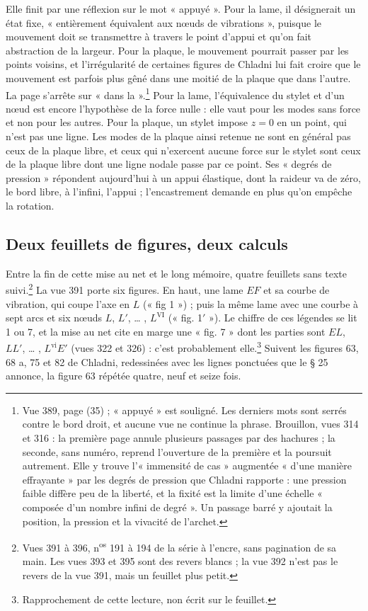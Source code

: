 \documentclass[11pt,a4paper]{article}
\begin{document}
Elle finit par une réflexion sur le mot « appuyé ». Pour la lame, il désignerait un état fixe, « entièrement équivalent aux nœuds de vibrations », puisque le mouvement doit se transmettre à travers le point d'appui et qu'on fait abstraction de la largeur. Pour la plaque, le mouvement pourrait passer par les points voisins, et l'irrégularité de certaines figures de Chladni lui fait croire que le mouvement est parfois plus gêné dans une moitié de la plaque que dans l'autre. La page s'arrête sur « dans la ».\footnote{Vue 389, page (35) ; « appuyé » est souligné. Les derniers mots sont serrés contre le bord droit, et aucune vue ne continue la phrase. Brouillon, vues 314 et 316 : la première page annule plusieurs passages par des hachures ; la seconde, sans numéro, reprend l'ouverture de la première et la poursuit autrement. Elle y trouve l'« immensité de cas » augmentée « d'une manière effrayante » par les degrés de pression que Chladni rapporte : une pression faible diffère peu de la liberté, et la fixité est la limite d'une échelle « composée d'un nombre infini de degré ». Un passage barré y ajoutait la position, la pression et la vivacité de l'archet.} Pour la lame, l'équivalence du stylet et d'un nœud est encore l'hypothèse de la force nulle : elle vaut pour les modes sans force et non pour les autres. Pour la plaque, un stylet impose $z=0$ en un point, qui n'est pas une ligne. Les modes de la plaque ainsi retenue ne sont en général pas ceux de la plaque libre, et ceux qui n'exercent aucune force sur le stylet sont ceux de la plaque libre dont une ligne nodale passe par ce point. Ses « degrés de pression » répondent aujourd'hui à un appui élastique, dont la raideur va de zéro, le bord libre, à l'infini, l'appui ; l'encastrement demande en plus qu'on empêche la rotation.

\subsection*{Deux feuillets de figures, deux calculs}

Entre la fin de cette mise au net et le long mémoire, quatre feuillets sans texte suivi.\footnote{Vues 391 à 396, n\textsuperscript{os} 191 à 194 de la série à l'encre, sans pagination de sa main. Les vues 393 et 395 sont des revers blancs ; la vue 392 n'est pas le revers de la vue 391, mais un feuillet plus petit.} La vue 391 porte six figures. En haut, une lame $EF$ et sa courbe de vibration, qui coupe l'axe en $L$ (« fig 1 ») ; puis la même lame avec une courbe à sept arcs et six nœuds $L$, $L'$, … , $L^{\text{VI}}$ (« fig. 1$'$ »). Le chiffre de ces légendes se lit 1 ou 7, et la mise au net cite en marge une « fig. 7 » dont les parties sont $EL$, $LL'$, … , $L^{\text{vi}}E'$ (vues 322 et 326) : c'est probablement elle.\footnote{Rapprochement de cette lecture, non écrit sur le feuillet.} Suivent les figures 63, 68 a, 75 et 82 de Chladni, redessinées avec les lignes ponctuées que le § 25 annonce, la figure 63 répétée quatre, neuf et seize fois.
\end{document}
